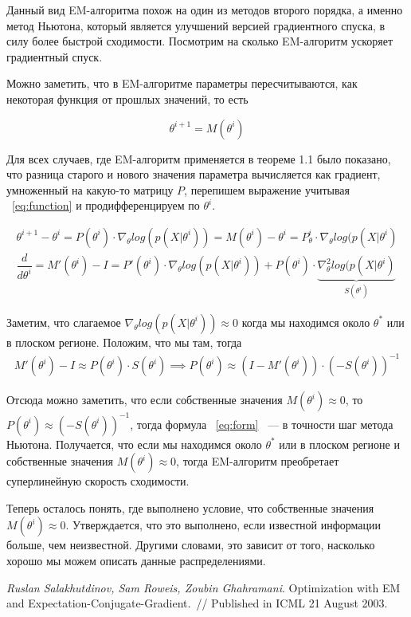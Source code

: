 \documentclass[12pt,fleqn]{article}
\begin{document}
Данный вид EM-алгоритма похож на один из методов второго порядка, а именно метод Ньютона, который является улучшений версией градиентного спуска, в силу более быстрой сходимости. Посмотрим на сколько EM-алгоритм ускоряет градиентный спуск.

Можно заметить, что в EM-алгоритме параметры пересчитываются, как некоторая функция от прошлых значений, то есть

\begin{equation}
\label{eq:function}
\theta^{i+1} = M(\theta^i)
\end{equation}

Для всех случаев, где EM-алгоритм применяется в теореме 1.1 было показано, что разница старого и нового значения параметра вычисляется как градиент, умноженный на какую-то матрицу $P$, перепишем выражение учитывая ~\eqref{eq:function} и продифференцируем по $\theta^i$. 

\begin{gather*}
 \theta^{i+1} - \theta^{i}= P(\theta^i)\cdot\nabla_{\theta} log(p(X|\theta^i)) = M(\theta^i) - \theta^i= P_{\theta}^i\cdot\nabla_{\theta} log(p(X|\theta^i)\\
 \dfrac{d}{d \theta^i} = M'(\theta^i) - I = P'(\theta^i)\cdot \nabla_{\theta} log(p(X|\theta^i)) +P(\theta^i)\cdot \underbrace{\nabla^2_{\theta} log(p(X|\theta^i)}_{S(\theta^i)}
\end{gather*}

Заметим, что слагаемое $\nabla_{\theta} log(p(X|\theta^i))\approx 0$ когда мы находимся около $\theta^*$ или в плоском регионе. Положим, что мы там, тогда
\begin{gather*}
 M'(\theta^i) - I \approx P(\theta^i)\cdot S(\theta^i) \implies P(\theta^i) \approx \left(I-M'(\theta^i)\right)\cdot \left(-S(\theta^i)\right)^{-1}
\end{gather*}

Отсюда можно заметить, что если собственные значения $M(\theta^i) \approx 0$, то\\ $P(\theta^i)\approx (-S(\theta^i))^{-1}$, тогда формула ~\eqref{eq:form} ~--- в точности шаг метода Ньютона. Получается, что если мы находимся около $\theta^*$ или в плоском регионе и собственные значения $M(\theta^i) \approx 0$, тогда EM-алгоритм преобретает суперлинейную скорость сходимости.

Теперь осталось понять, где выполнено условие, что собственные значения $M(\theta^i) \approx 0$. Утверждается, что это выполнено, если известной информации больше, чем неизвестной. Другими словами, это зависит от того, насколько хорошо мы можем описать данные распределениями.

\begin{thebibliography}{1}
    \emph{Ruslan Salakhutdinov, Sam Roweis, Zoubin Ghahramani}.
    Optimization with EM and Expectation-Conjugate-Gradient.~//
    Published in ICML 21 August 2003.
\end{thebibliography}
\end{document}
